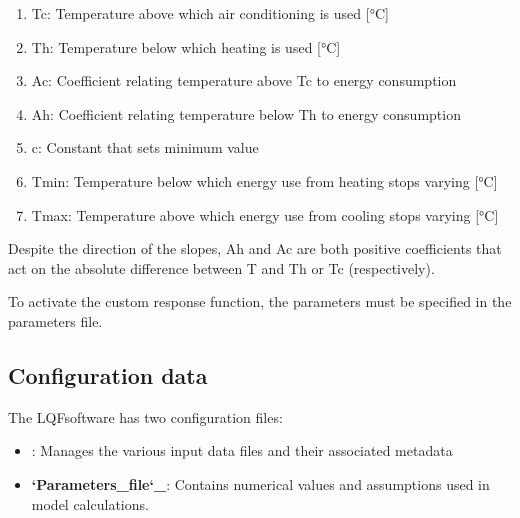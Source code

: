 \documentclass[letterpaper,10pt,english]{sphinxmanual}
\begin{document}
\begin{figure}[htbp]
\centering
\capstart

\noindent{}
\caption{}\label{\detokenize{OtherManuals/LQF_Manual:id4}}\end{figure}
\begin{enumerate}
\item {} 
Tc: Temperature above which air conditioning is used {[}°C{]}

\item {} 
Th: Temperature below which heating is used {[}°C{]}

\item {} 
Ac: Coefficient relating temperature above Tc to energy consumption

\item {} 
Ah: Coefficient relating temperature below Th to energy consumption

\item {} 
c: Constant that sets minimum value

\item {} 
Tmin: Temperature below which energy use from heating stops varying
{[}°C{]}

\item {} 
Tmax: Temperature above which energy use from cooling stops varying
{[}°C{]}

\end{enumerate}

Despite the direction of the slopes, Ah and Ac are both positive
coefficients that act on the absolute difference between T and Th or Tc
(respectively).

To activate the custom response function, the parameters must be
specified in the parameters file.


\subsection{Configuration data}
\label{\detokenize{OtherManuals/LQF_Manual:configuration-data}}
The LQFsoftware has two configuration files:
\begin{itemize}
\item {} 
{\hyperref[\detokenize{OtherManuals/LQF_Manual:data-sources-file}]{}}: Manages the various input
data files and their associated metadata

\item {} 
{\color{red}\bfseries{}{}`Parameters\_file{}`\_}: Contains numerical values and
assumptions used in model calculations.

\end{itemize}
\end{document}
